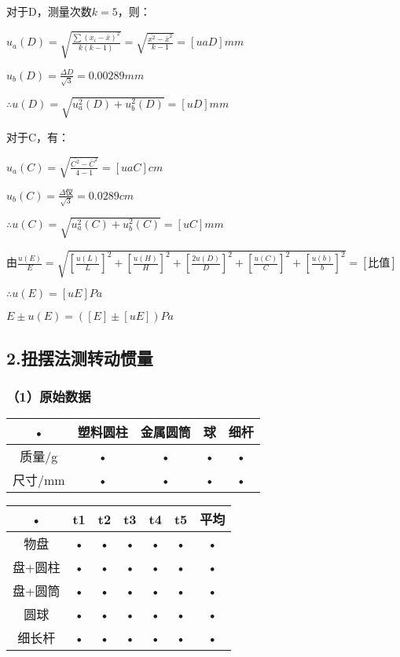 \documentclass[11pt,a4paper,oneside]{article}
\begin{document}
对于D，测量次数$k= 5$，则：

$u_a(D) = \sqrt{\displaystyle\frac{\sum (x_i-\bar{x})^2}{k(k-1)}}= \sqrt{\displaystyle\frac{\bar{x^2} - \bar{x}^2}{k-1}} = [uaD]mm$

$u_b(D) = \displaystyle\frac{\Delta D}{\sqrt{3}} = 0.00289mm$

$\therefore u(D) = \sqrt{u_a^2(D)+u_b^2(D)} = [uD]mm$

对于C，有：

$u_a(C) = \sqrt{\displaystyle\frac{\bar{C^2}-\bar{C}^2}{4-1}}=[uaC]cm$

$u_b(C) = \displaystyle\frac{\Delta 仪}{\sqrt{3}} = 0.0289cm$

$\therefore u(C) = \sqrt{u_a^2(C)+u_b^2(C)} = [uC]mm$

由$\displaystyle\frac{u(E)}{E} = \sqrt{[\displaystyle\frac{u(L)}{L}]^2+[\displaystyle\frac{u(H)}{H}]^2+[\displaystyle\frac{2u(D)}{D}]^2+[\displaystyle\frac{u(C)}{C}]^2+[\displaystyle\frac{u(b)}{b}]^2} = [比值]$

$\therefore u(E) = [uE]Pa$

$E \pm u(E) = ([E]\pm [uE])Pa$

\subsection{2.扭摆法测转动惯量}
\subsubsection{（1）原始数据}
\begin{tabular}{|c|c|c|c|c|}
\hline 
• & 塑料圆柱 & 金属圆筒 & 球 & 细杆 \\ 
\hline 
质量/g & • & • & • & • \\ 
\hline 
尺寸/mm & • & • & • & • \\ 
\hline 
\end{tabular} 

\begin{tabular}{|c|c|c|c|c|c|c|}
\hline 
• & t1 & t2 & t3 & t4 & t5 & 平均 \\ 
\hline 
物盘 & • & • & • & • & • & • \\ 
\hline 
盘+圆柱 & • & • & • & • & • & • \\ 
\hline 
盘+圆筒 & • & • & • & • & • & • \\ 
\hline 
圆球 & • & • & • & • & • & • \\ 
\hline 
细长杆 & • & • & • & • & • & • \\ 
\hline 
\end{tabular} 
\end{document}
